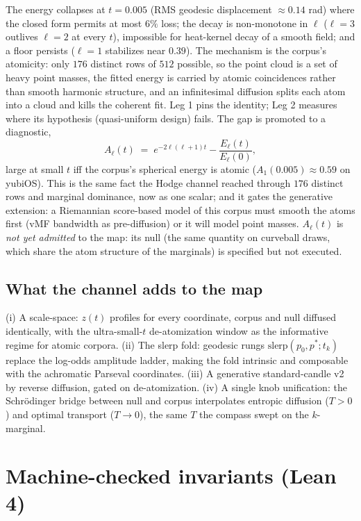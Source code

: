 \documentclass[11pt,a4paper]{article}
\theoremstyle{plain}
\theoremstyle{remark}
\begin{document}
The energy collapses at $t=0.005$ (RMS geodesic displacement ${\approx}0.14$ rad) where the closed form permits at most $6\%$ loss; the decay is non-monotone in $\ell$ ($\ell=3$ outlives $\ell=2$ at every $t$), impossible for heat-kernel decay of a smooth field; and a floor persists ($\ell=1$ stabilizes near $0.39$). The mechanism is the corpus's atomicity: only $176$ distinct rows of $512$ possible, so the point cloud is a set of heavy point masses, the fitted energy is carried by atomic coincidences rather than smooth harmonic structure, and an infinitesimal diffusion splits each atom into a cloud and kills the coherent fit. Leg 1 pins the identity; Leg 2 measures where its hypothesis (quasi-uniform design) fails. The gap is promoted to a diagnostic,
\begin{equation}
A_\ell(t)\;=\;e^{-2\ell(\ell+1)t}-\frac{E_\ell(t)}{E_\ell(0)},\tag{10}
\end{equation}
large at small $t$ iff the corpus's spherical energy is atomic ($A_1(0.005)\approx0.59$ on yubiOS). This is the same fact the Hodge channel reached through $176$ distinct rows and marginal dominance, now as one scalar; and it gates the generative extension: a Riemannian score-based model of this corpus must smooth the atoms first (vMF bandwidth as pre-diffusion) or it will model point masses. $A_\ell(t)$ is \emph{not yet admitted} to the map: its null (the same quantity on curveball draws, which share the atom structure of the marginals) is specified but not executed.

\subsection{What the channel adds to the map}
(i) A scale-space: $z(t)$ profiles for every coordinate, corpus and null diffused identically, with the ultra-small-$t$ de-atomization window as the informative regime for atomic corpora. (ii) The slerp fold: geodesic rungs $\mathrm{slerp}(p_0,p^*;t_k)$ replace the log-odds amplitude ladder, making the fold intrinsic and composable with the achromatic Parseval coordinates. (iii) A generative standard-candle v2 by reverse diffusion, gated on de-atomization. (iv) A single knob unification: the Schr\"odinger bridge between null and corpus interpolates entropic diffusion ($T>0$) and optimal transport ($T\to0$), the same $T$ the compass swept on the $k$-marginal.

\section{Machine-checked invariants (Lean 4)}
\label{sec:lean}
\end{document}
